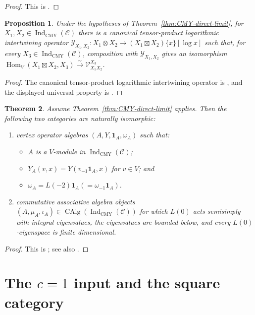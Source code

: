 \documentclass[10pt,a4paper]{amsart}
\numberwithin{equation}{section} \newtheorem{thm}{Theorem}[section] \newtheorem{lem}[thm]{Lemma} \newtheorem{ex}[thm]{Example} \newtheorem{prop}[thm]{Proposition} \newtheorem{cor}[thm]{Corollary} \newtheorem{defi}[thm]{Definition} \newtheorem{rmk}[thm]{Remark} \newtheorem{notation}[thm]{Notation}
\newcommand{\one}{\mathbf{1}}
\newcommand{\Hom}{\operatorname{Hom}}
\newcommand{\CAlg}{\operatorname{CAlg}}
\newcommand{\IndCMY}{\operatorname{Ind}_{\mathrm{CMY}}}
\begin{document}
\begin{proof}
This is \cite[Corollary~2.14]{CMY}.
\end{proof}

\begin{prop}
\label{prop:CMY-tensor-universal}
Under the hypotheses of Theorem~\ref{thm:CMY-direct-limit}, for $X_1,X_2\in\IndCMY(\mathcal C)$ there is a canonical tensor-product logarithmic intertwining operator \(\mathcal Y_{X_1,X_2}:X_1\otimes X_2\longrightarrow(X_1\boxtimes X_2)\{x\}[\log x]\) such that, for every $X_3\in\IndCMY(\mathcal C)$, composition with $\mathcal Y_{X_1,X_2}$ gives an isomorphism \(\Hom_V(X_1\boxtimes X_2,X_3)\overset{\sim}{\longrightarrow}\mathcal V^{X_3}_{X_1 X_2}\).
\end{prop}

\begin{proof}
The canonical tensor-product logarithmic intertwining operator is \cite[Theorem~6.1(1)]{CMY}, and the displayed universal property is \cite[Theorem~6.1(2)]{CMY}.
\end{proof}

\begin{thm}
\label{thm:CMY-extension}
Assume Theorem~\ref{thm:CMY-direct-limit} applies. Then the following two categories are naturally isomorphic:
\begin{enumerate}[label=\textnormal{(\arabic*)}]
\item vertex operator algebras $(A,Y,\one_A,\omega_A)$ such that:
\begin{itemize}
\item $A$ is a $V$-module in $\IndCMY(\mathcal C)$;
\item $Y_A(v,x)=Y(v_{-1}\one_A,x)$ for $v\in V$; and
\item $\omega_A=L(-2)\one_A(=\omega_{-1}\one_A)$.
\end{itemize}
\item commutative associative algebra objects
\((A,\mu_A,\iota_A)\in\CAlg(\IndCMY(\mathcal C))\) for which $L(0)$ acts semisimply with integral eigenvalues, the eigenvalues are bounded below, and every $L(0)$-eigenspace is finite dimensional.
\end{enumerate}
\end{thm}

\begin{proof}
This is \cite[Theorem~7.5]{CMY}; see also \cite[Theorem~1.3]{CMY}.
\end{proof}

\section{The \texorpdfstring{$c=1$}{c=1} input and the square category}\label{sec:prelim}
\end{document}
